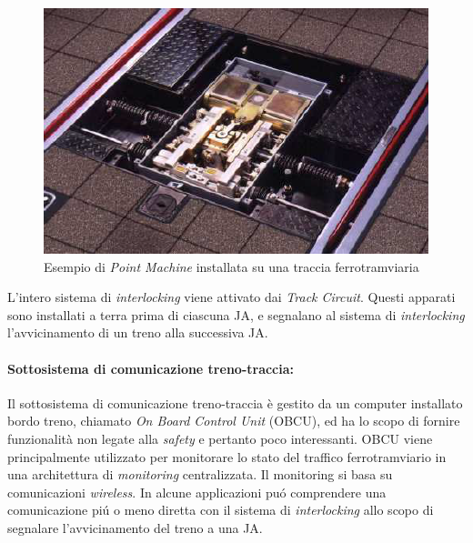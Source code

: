 \begin{itemize}
\begin{figure}[h]
		\centering
		\includegraphics[width=0.7\linewidth]{img/pointmachine}
		\caption{Esempio di \emph{Point Machine} installata su una traccia ferrotramviaria}
		\label{fig:pointmachine}
	\end{figure}
\end{itemize}
L'intero sistema di \emph{interlocking} viene attivato dai \emph{Track Circuit}. Questi apparati sono installati a terra prima di ciascuna JA, e segnalano al sistema di \emph{interlocking} l'avvicinamento di un treno alla successiva JA.
\paragraph{Sottosistema di comunicazione treno-traccia:} Il sottosistema di comunicazione treno-traccia \`e gestito da un computer installato bordo treno, chiamato \emph{On Board Control Unit} (OBCU), ed ha lo scopo di fornire funzionalit\`a non legate alla \emph{safety} e pertanto poco interessanti. OBCU viene principalmente utilizzato per monitorare lo stato del traffico ferrotramviario in una architettura di \emph{monitoring} centralizzata. Il monitoring si basa su comunicazioni \emph{wireless}. In alcune applicazioni pu\'o comprendere una comunicazione pi\'u o meno diretta con il sistema di \emph{interlocking} allo scopo di segnalare l'avvicinamento del treno a una JA.
